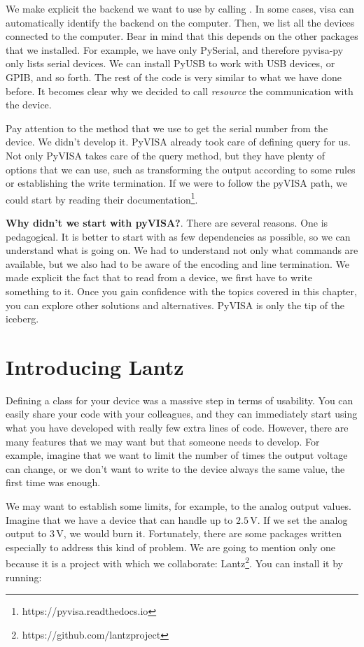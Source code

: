 \sloppy We make explicit the backend we want to use by calling . In some cases, visa can automatically identify the backend on the computer. Then, we list all the devices connected to the computer. Bear in mind that this depends on the other packages that we installed. For example, we have only PySerial, and therefore pyvisa-py only lists serial devices. We can install PyUSB to work with USB devices, or GPIB, and so forth. The rest of the code is very similar to what we have done before. It becomes clear why we decided to call \emph{resource} the communication with the device.

Pay attention to the  method that we use to get the serial number from the device. We didn't develop it. PyVISA already took care of defining query for us. Not only PyVISA takes care of the query method, but they have plenty of options that we can use, such as transforming the output according to some rules or establishing the write termination. If we were to follow the pyVISA path, we could start by reading their documentation\footnote{https://pyvisa.readthedocs.io}.

\textbf{Why didn't we start with pyVISA?}. There are several reasons. One is pedagogical. It is better to start with as few dependencies as possible, so we can understand what is going on. We had to understand not only what commands are available, but we also had to be aware of the encoding and line termination. We made explicit the fact that to read from a device, we first have to write something to it. Once you gain confidence with the topics covered in this chapter, you can explore other solutions and alternatives. PyVISA is only the tip of the iceberg.

\section{Introducing Lantz}\label{sec:lantz}
Defining a class for your device was a massive step in terms of usability. You can easily share your code with your colleagues, and they can immediately start using what you have developed with really few extra lines of code. However, there are many features that we may want but that someone needs to develop. For example, imagine that we want to limit the number of times the output voltage can change, or we don't want to write to the device always the same value, the first time was enough.

We may want to establish some limits, for example, to the analog output values. Imagine that we have a device that can handle up to $2.5\,\textrm{V}$. If we set the analog output to $3\,\textrm{V}$, we would burn it. Fortunately, there are some packages written especially to address this kind of problem. We are going to mention only one because it is a project with which we collaborate: Lantz\footnote{https://github.com/lantzproject}. You can install it by running:

